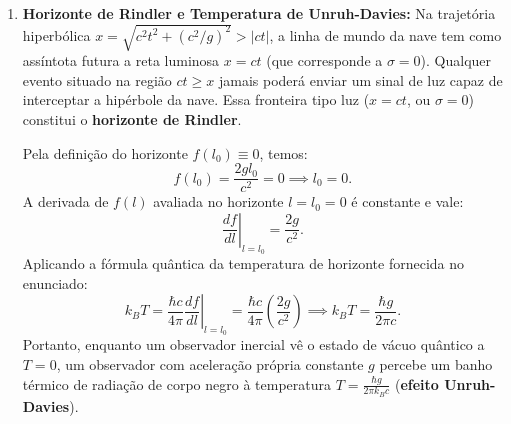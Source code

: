 \documentclass[11pt, a4paper]{article}
\begin{document}
\begin{enumerate}[label=\alph*)]
    \item \textbf{Horizonte de Rindler e Temperatura de Unruh-Davies:} Na trajetória hiperbólica $x = \sqrt{c^2 t^2 + (c^2/g)^2} > |ct|$, a linha de mundo da nave tem como assíntota futura a reta luminosa $x = ct$ (que corresponde a $\sigma = 0$). Qualquer evento situado na região $ct \ge x$ jamais poderá enviar um sinal de luz capaz de interceptar a hipérbole da nave. Essa fronteira tipo luz ($x = ct$, ou $\sigma = 0$) constitui o \textbf{horizonte de Rindler}.

    Pela definição do horizonte $f(l_0) \equiv 0$, temos:
    \begin{equation}
    f(l_0) = \frac{2 g l_0}{c^2} = 0 \implies l_0 = 0.
    \end{equation}
    A derivada de $f(l)$ avaliada no horizonte $l = l_0 = 0$ é constante e vale:
    \begin{equation}
    \left. \frac{df}{dl} \right|_{l=l_0} = \frac{2g}{c^2}.
    \end{equation}
    Aplicando a fórmula quântica da temperatura de horizonte fornecida no enunciado:
    \begin{equation}
    k_B T = \frac{\hbar c}{4\pi} \left. \frac{df}{dl} \right|_{l=l_0} = \frac{\hbar c}{4\pi} \left( \frac{2g}{c^2} \right) \implies k_B T = \frac{\hbar g}{2\pi c}.
    \end{equation}
    Portanto, enquanto um observador inercial vê o estado de vácuo quântico a $T = 0$, um observador com aceleração própria constante $g$ percebe um banho térmico de radiação de corpo negro à temperatura $T = \frac{\hbar g}{2\pi k_B c}$ (\textbf{efeito Unruh-Davies}).


\end{enumerate}
\end{document}

